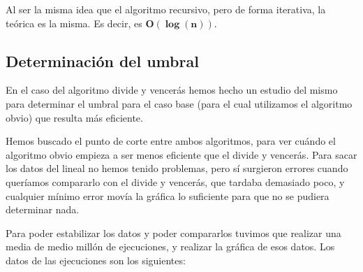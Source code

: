 Al ser la misma idea que el algoritmo recursivo, pero de forma iterativa, la  teórica es la misma. Es decir, es  $\mathbf{O(\log(n))}$.

\subsection{Determinación del umbral}

En el caso del algoritmo divide y vencerás hemos hecho un estudio del mismo para determinar el umbral para el caso base (para el cual utilizamos el algoritmo obvio) que resulta más eficiente.


Hemos buscado el punto de corte entre ambos algoritmos, para ver cuándo el algoritmo obvio empieza a ser menos eficiente que el divide y vencerás. Para sacar los datos del lineal no hemos tenido problemas, pero sí surgieron errores cuando queríamos compararlo con el divide y vencerás, que tardaba demasiado poco, y cualquier mínimo error movía la gráfica lo suficiente para que no se pudiera determinar nada.

Para poder estabilizar los datos y poder compararlos tuvimos que realizar una media de medio millón de ejecuciones, y realizar la gráfica de esos datos. Los datos de las ejecuciones son los siguientes:

\vspace*{1cm}

\posObvioComp
{}\posDyVComp
{} {\posObvioComp}

\pgfplotstabletypeset[
display columns/0/.style={column name=Tamaño},
display columns/1/.style={column name=Algoritmo Obvio},
display columns/2/.style={column name=Algoritmo DyV (rec)}
]{\posObvioComp}

\vspace*{1cm}

